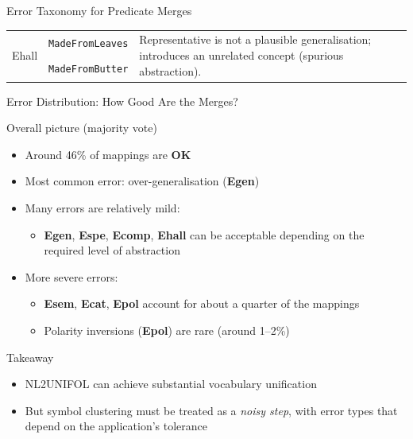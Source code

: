 \documentclass[presentation]{beamer}
\begin{document}
{\begin{frame}[allowframebreaks]{Error Taxonomy for Predicate Merges}
\begin{table}[t]
\begin{tabular}{p{} p{} p{}}
\multirow{2}{*}{Ehall}
& \texttt{MadeFromLeaves} &
\multirow{2}{0.47\textwidth}{Representative is not a plausible generalisation; introduces an unrelated concept (spurious abstraction).}
\\
& \texttt{MadeFromButter} &
\\
\end{tabular}
\end{table}


\end{frame}

\begin{frame}{Error Distribution: How Good Are the Merges?}

\begin{block}{Overall picture (majority vote)}
\begin{itemize}
    \item Around \alert{46\%} of mappings are \textbf{OK}
    \item Most common error: \alert{over-generalisation} (\textbf{Egen})
    \item Many errors are relatively mild:
    \begin{itemize}
        \item \textbf{Egen}, \textbf{Espe}, \textbf{Ecomp}, \textbf{Ehall} can be acceptable depending on the required level of abstraction
    \end{itemize}
    \item More severe errors:
    \begin{itemize}
        \item \textbf{Esem}, \textbf{Ecat}, \textbf{Epol} account for about a quarter of the mappings
        \item Polarity inversions (\textbf{Epol}) are rare (around 1–2\%)
    \end{itemize}
\end{itemize}
\end{block}

\begin{block}{Takeaway}
\begin{itemize}
    \item NL2UNIFOL can achieve substantial vocabulary unification
    \item But symbol clustering must be treated as a \emph{noisy step},
          with error types that depend on the application's tolerance
\end{itemize}
\end{block}

\end{frame}

} %
\end{document}
